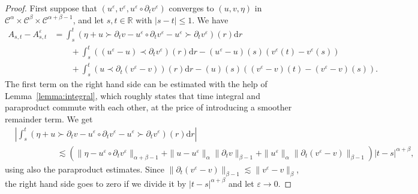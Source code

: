 \documentclass[11pt,a4paper]{article}
\newcommand{\mathd}{\mathrm{d}}
\theoremstyle{remark}
\newcommand{\CC}{\ensuremath{\mathscr{C}}}
\begin{document}
\begin{proof}
  First suppose that $( u^{\varepsilon} ,v^{\varepsilon} ,u^{\varepsilon} \circ \partial_{t} v^{\varepsilon} )$ converges to $( u,v, \eta )$ in
  $\CC^{\alpha} \times \CC^\beta \times \CC^{\alpha + \beta -1}$, and let $s, t \in \mathbb{R}$ with $| s-t | \leqslant 1$.
  We have
  \begin{align}\label{eq:classical rough path pr1} \nonumber
     A_{s,t} -A^{\varepsilon}_{s,t} %
     & = \int_{s}^{t} ( \eta +u \succ \partial_{t} v-u^{\varepsilon} \circ  \partial_{t} v^{\varepsilon} -u^{\varepsilon} \succ \partial_{t}  v^{\varepsilon} ) ( r ) \mathd r \\ \nonumber
     &\qquad + \int_{s}^{t} ( ( u^{\varepsilon} -u ) \prec \partial_{t} v^{\varepsilon} ) ( r ) \mathd r- ( u^{\varepsilon} -u ) ( s ) ( v^{\varepsilon} ( t ) -v^{\varepsilon} ( s ) ) \\
     &\qquad + \int_{s}^{t} ( u \prec \partial_{t} ( v^{\varepsilon} -v ) ) ( r ) \mathd r- ( u ) ( s ) ( ( v^{\varepsilon} -v ) ( t ) - ( v^{\varepsilon} -v ) ( s ) ) .
  \end{align}
  The first term on the right hand side can be estimated with the help of
  Lemma~\ref{lemma:integral}, which roughly states that time integral and paraproduct commute with each other, at the price of introducing a smoother remainder term. We get
  \begin{align*}
     &\left| \int_{s}^{t} ( \eta +u \succ \partial_{t} v-u^{\varepsilon} \circ  \partial_{t} v^{\varepsilon} -u^{\varepsilon} \succ \partial_{t} v^{\varepsilon} ) ( r ) \mathd r \right| \\
     &\hspace{60pt} \lesssim ( \| \eta -u^{\varepsilon} \circ \partial_{t} v^{\varepsilon} \|_{\alpha + \beta -1} + \| u-u^{\varepsilon} \|_{\alpha} \| \partial_{t}  v \|_{\beta -1} + \| u^{\varepsilon} \|_{\alpha} \| \partial_{t} (v^{\varepsilon} -v ) \|_{\beta -1} ) | t-s |^{\alpha + \beta} ,
  \end{align*}
  using also the paraproduct estimates. Since $\| \partial_{t} ( v^{\varepsilon} -v ) \|_{\beta -1} \lesssim \| v^{\varepsilon} -v \|_{\beta}$, the right hand side goes to zero if we divide it by $| t-s |^{\alpha + \beta}$ and let $\varepsilon \rightarrow 0$.
  

\end{proof}
\end{document}
